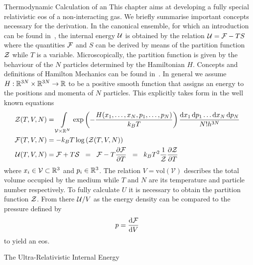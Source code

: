 \begin{section}{Thermodynamic Calculation of an \texorpdfstring{}{EoS}}
This chapter aims at developing a fully special relativistic \ac{eos} of a non-interacting gas.
We briefly summarise important concepts necessary for the derivation.
In the canonical ensemble, for which an introduction can be found in~\cite{fliessbachStatistischePhysikLehrbuch2018}, the internal energy $\mathcal{U}$ is obtained by the relation $\mathcal{U}=\mathcal{F}-TS$ where the quantities $\mathcal{F}$ and $S$ can be derived by means of the partition function $\mathcal{Z}$ while $T$ is a variable.
Microscopically, the partition function is given by the behaviour of the $N$ particles determined by the Hamiltonian $H$.
Concepts and definitions of Hamilton Mechanics can be found in~\cite{eschrigTopologyGeometryPhysics2011, fliessbachMechanikLehrbuchZur2020, spivakPhysicsMathematiciansMechanics2010}.
In general we assume $H:\mathbb{R}^{3N}\times\mathbb{R}^{3N}\rightarrow\mathbb{R}$ to be a positive smooth function that assigns an energy to the positions and momenta of $N$ particles.
This explicitly takes form in the well known equations
\begin{align}
	\mathcal{Z}(T,V,N) 	&= \int\limits_{\mathcal{V}\times\mathbb{R}^N}\exp\left(-\frac{H(x_1,\dots,x_N,p_1,\dots,p_N)}{k_B T}\right)\frac{\mathop{}\!\mathrm{d} x_1\mathop{}\!\mathrm{d} p_1\dots \mathop{}\!\mathrm{d} x_N\mathop{}\!\mathrm{d} p_N}{N!h^{3N}}\\
	\mathcal{F}(T,V,N) 	&= - k_B T\log\left(\mathcal{Z}(T,V,N)\right)\label{2-IntEner-FreeEnerDef}\\
	\mathcal{U}(T,V,N) 	&= \mathcal{F} + T \mathcal{S} \hspace{0.2cm}=\hspace{0.2cm} \mathcal{F} - T\frac{\partial\mathcal{F}}{\partial T} \hspace{0.2cm}=\hspace{0.2cm} k_B T^2\frac{1}{\mathcal{Z}}\frac{\partial\mathcal{Z}}{\partial T}\label{2-IntEner-Def}
\end{align}
where $x_i\in \mathcal{V}\subset\mathbb{R}^3$  and $p_i\in \mathbb{R}^3$.
The relation $V=\text{vol}(\mathcal{V})$ describes the total volume occupied by the medium while $T$ and $N$ are its temperature and particle number respectively.
To fully calculate $U$ it is necessary to obtain the partition function $\mathcal{Z}$.
From there $\mathcal{U}/V$ as the energy density can be compared to the pressure defined by
\begin{equation}
	p=\frac{\mathop{}\!\mathrm{d}\mathcal{F}}{\mathop{}\!\mathrm{d} V}
	\label{eq:2-IntEner-pressureDef}
\end{equation}
to yield an \ac{eos}.
%
%
%
\begin{subsection}{The Ultra-Relativistic Internal Energy}

\end{subsection}
\end{section}
